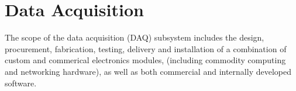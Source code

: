 

\chapter{Data Acquisition}
\label{ch:trig}

The scope of the data acquisition (DAQ) subsystem includes the 
design, procurement, fabrication, testing, delivery and installation 
of a combination of custom and commerical electronics modules, (including 
commodity computing and networking hardware), as well as both commercial 
and internally developed software. 

